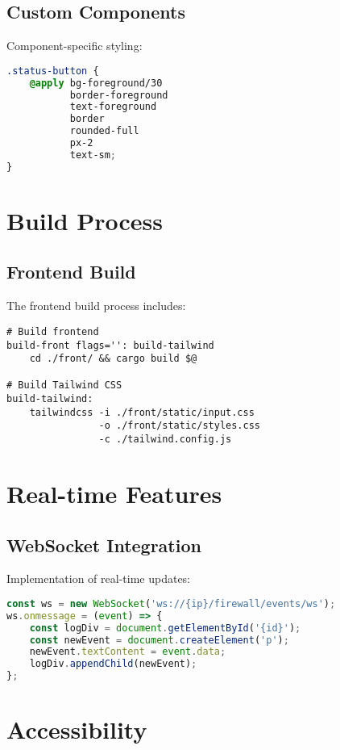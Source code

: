 \documentclass{article}
\begin{document}
\subsection{Custom Components}
Component-specific styling:

\begin{lstlisting}[language=css]
.status-button {
    @apply bg-foreground/30 
           border-foreground 
           text-foreground 
           border 
           rounded-full 
           px-2 
           text-sm;
}
\end{lstlisting}

\section{Build Process}

\subsection{Frontend Build}
The frontend build process includes:

\begin{verbatim}
# Build frontend
build-front flags='': build-tailwind
    cd ./front/ && cargo build $@

# Build Tailwind CSS
build-tailwind:
    tailwindcss -i ./front/static/input.css 
                -o ./front/static/styles.css 
                -c ./tailwind.config.js
\end{verbatim}

\section{Real-time Features}

\subsection{WebSocket Integration}
Implementation of real-time updates:

\begin{lstlisting}[language=javascript]
const ws = new WebSocket('ws://{ip}/firewall/events/ws');
ws.onmessage = (event) => {
    const logDiv = document.getElementById('{id}');
    const newEvent = document.createElement('p');
    newEvent.textContent = event.data;
    logDiv.appendChild(newEvent);
};
\end{lstlisting}

\section{Accessibility}
\end{document}
